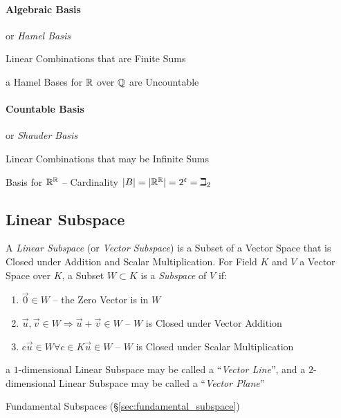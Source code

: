 \paragraph{Algebraic Basis}\label{sec:algebraic_basis}\hfill

or \emph{Hamel Basis}

Linear Combinations that are Finite Sums

a Hamel Bases for $\mathbb{R}$ over $\mathbb{Q}$ are Uncountable



\paragraph{Countable Basis}\label{sec:countable_basis}\hfill

or \emph{Shauder Basis}

Linear Combinations that may be Infinite Sums

Basis for $\mathbb{R}^{\mathbb{R}}$ -- Cardinality
$|B| = |\mathbb{R}^{\mathbb{R}}| = 2^\mathfrak{c} = \beth_2$



\subsection{Linear Subspace}\label{sec:linear_subspace}

A \emph{Linear Subspace} (or \emph{Vector Subspace}) is a Subset of a Vector
Space that is Closed under Addition and Scalar Multiplication. For Field $K$
and $V$ a Vector Space over $K$, a Subset $W \subset K$ is a \emph{Subspace} of
$V$ if:
\begin{enumerate}
  \item $\vec{0} \in W$ -- the Zero Vector is in $W$
  \item $\vec{u}, \vec{v} \in W \Rightarrow \vec{u} + \vec{v} \in W$
    -- $W$ is Closed under Vector Addition
  \item $c\vec{u} \in W \forall c \in K \vec{u} \in W$
    -- $W$ is Closed under Scalar Multiplication
\end{enumerate}

a $1$-dimensional Linear Subspace may be called a ``\emph{Vector Line}'', and a
$2$-dimensional Linear Subspace may be called a ``\emph{Vector Plane}''

\fist Fundamental Subspaces (\S\ref{sec:fundamental_subspace})

